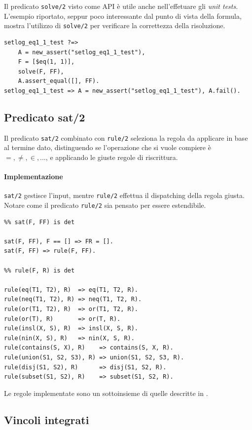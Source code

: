 \documentclass[12pt,a4paper,openright]{book}  %
\begin{document}
Il predicato \verb|solve/2| visto come API è utile anche
nell'effetuare gli \emph{unit tests}. L'esempio riportato, seppur poco
interessante dal punto di vista della formula, mostra l'utilizzo di
\verb|solve/2| per verificare la correttezza della risoluzione.
\begin{verbatim}
setlog_eq1_1_test ?=>
    A = new_assert("setlog_eq1_1_test"),
    F = [$eq(1, 1)],
    solve(F, FF),
    A.assert_equal([], FF).
setlog_eq1_1_test => A = new_assert("setlog_eq1_1_test"), A.fail().
\end{verbatim}

\subsection{Predicato sat/2}
\label{subsec:lsetpicat_solver_sat2}

Il predicato \verb|sat/2| combinato con \verb|rule/2| seleziona la
regola da applicare in base al termine dato, distinguendo se
l'operazione che si vuole compiere è $=, \neq, \in, \ldots$, e
applicando le giuste regole di riscrittura.

\paragraph{Implementazione}
\verb|sat/2| gestisce l'input, mentre \verb|rule/2| effettua il
dispatching della regola giusta. Notare come il predicato
\verb|rule/2| sia pensato per essere estendibile.
\begin{verbatim}
%% sat(F, FF) is det

sat(F, FF), F == [] => FR = [].
sat(F, FF) => rule(F, FF).

%% rule(F, R) is det

rule(eq(T1, T2), R)  => eq(T1, T2, R).
rule(neq(T1, T2), R) => neq(T1, T2, R).
rule(or(T1, T2), R)  => or(T1, T2, R).
rule(or(T), R)       => or(T, R).
rule(insl(X, S), R)  => insl(X, S, R).
rule(nin(X, S), R)   => nin(X, S, R).
rule(contains(S, X), R)    => contains(S, X, R).
rule(union(S1, S2, S3), R) => union(S1, S2, S3, R).
rule(disj(S1, S2), R)      => disj(S1, S2, R).
rule(subset(S1, S2), R)    => subset(S1, S2, R).
\end{verbatim}

Le regole implementate sono un sottoinsieme di quelle descritte in
\cite{Rossi18}.

\subsection{Vincoli integrati}
\label{subsec:lsetpicat_solver_rewriterules}
\end{document}
